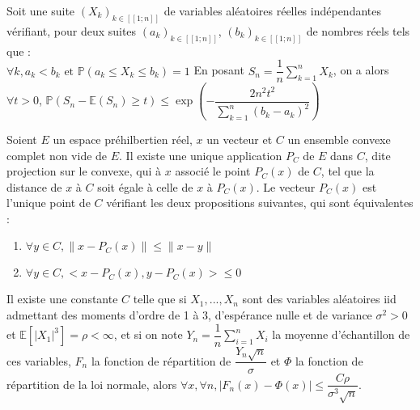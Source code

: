 \documentclass[landscape,twocolumn]{article}
\begin{document}
\begin{ine}
\begin{center}
Soit une suite $(X_k)_{k \in [\![1;n]\!]}$ de variables aléatoires réelles indépendantes vérifiant, pour deux suites $(a_k)_{k \in [\![1;n]\!]}$, $(b_k)_{k \in [\![1;n]\!]}$ de nombres réels tels que : \\
$\forall k, a_k < b_k \text{ et } \mathbb{P}(a_k \leq X_k \leq b_k) =1$
En posant $S_n = \dfrac{1}{n} \displaystyle \sum \limits_{k=1}^n X_k$, on a alors $\forall t > 0$, 
$\mathbb{P}(S_n - \mathbb{E}(S_n) \geq t) \leq \exp\left(-\dfrac{2n^2t^2}{\sum \limits_{k=1}^n (b_k-a_k)^2}\right)$
\end{center}
\end{ine}

\begin{ine}
\begin{center}
Soient $E$ un espace préhilbertien réel, $x$ un vecteur et $C$ un ensemble convexe complet non vide de $E$.
Il existe une unique application $P_C$ de $E$ dans $C$, dite projection sur le convexe, qui à $x$ associé le point $P_C(x)$ de $C$, tel que la distance de $x$ à $C$ soit égale à celle de $x$ à $P_C(x)$. Le vecteur $P_C(x)$ est l'unique point de $C$ vérifiant les deux propositions suivantes, qui sont équivalentes : 
\begin{enumerate}
\item $\forall y \in C, \parallel x - P_C(x) \parallel \leq \parallel x - y \parallel$ \\
\item $\forall y \in C, <x-P_C(x), y-P_C(x) > \leq 0$
\end{enumerate}
\end{center}
\end{ine}

\begin{ine}
\begin{center}
Il existe une constante $C$ telle que si $X_1, ..., X_n$ sont des variables aléatoires iid admettant des moments d'ordre de 1 à 3, d'espérance nulle et de variance $\sigma^2 >0$ et $\mathbb{E}[|X_1|^3] = \rho < \infty$, et si on note $Y_n = \dfrac{1}{n} \sum \limits_{i=1}^n X_i$ la moyenne d'échantillon de ces variables, $F_n$ la fonction de répartition de $\dfrac{Y_n\sqrt{n}}{\sigma}$ et $\Phi$ la fonction de répartition de la loi normale, alors $\forall x,\forall n, |F_n(x) - \Phi(x) | \leq \dfrac{C\rho}{\sigma^3 \sqrt{n}}$.
\end{center}
\end{ine}
\end{document}
